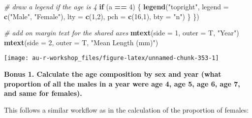 \documentclass[]{book}
\newenvironment{Shaded}{\begin{snugshade}}{\end{snugshade}}
\newcommand{\KeywordTok}[1]{\textcolor[rgb]{0.13,0.29,0.53}{\textbf{#1}}}
\newcommand{\DataTypeTok}[1]{\textcolor[rgb]{0.13,0.29,0.53}{#1}}
\newcommand{\DecValTok}[1]{\textcolor[rgb]{0.00,0.00,0.81}{#1}}
\newcommand{\StringTok}[1]{\textcolor[rgb]{0.31,0.60,0.02}{#1}}
\newcommand{\CommentTok}[1]{\textcolor[rgb]{0.56,0.35,0.01}{\textit{#1}}}
\newcommand{\ControlFlowTok}[1]{\textcolor[rgb]{0.13,0.29,0.53}{\textbf{#1}}}
\newcommand{\OperatorTok}[1]{\textcolor[rgb]{0.81,0.36,0.00}{\textbf{#1}}}
\newcommand{\NormalTok}[1]{#1}
\theoremstyle{definition}
\theoremstyle{definition}
\theoremstyle{definition}
\theoremstyle{remark}
\begin{document}
\begin{Shaded}
\begin{Highlighting}[]
  \CommentTok{# draw a legend if the age is 4}
  \ControlFlowTok{if}\NormalTok{ (a }\OperatorTok{==}\StringTok{ }\DecValTok{4}\NormalTok{) \{}
    \KeywordTok{legend}\NormalTok{(}\StringTok{"topright"}\NormalTok{, }\DataTypeTok{legend =} \KeywordTok{c}\NormalTok{(}\StringTok{"Male"}\NormalTok{, }\StringTok{"Female"}\NormalTok{),}
           \DataTypeTok{lty =} \KeywordTok{c}\NormalTok{(}\DecValTok{1}\NormalTok{,}\DecValTok{2}\NormalTok{), }\DataTypeTok{pch =} \KeywordTok{c}\NormalTok{(}\DecValTok{16}\NormalTok{,}\DecValTok{1}\NormalTok{), }\DataTypeTok{bty =} \StringTok{"n"}\NormalTok{)}
\NormalTok{  \}}
\NormalTok{\})}

\CommentTok{# add on margin text for the shared axes}
\KeywordTok{mtext}\NormalTok{(}\DataTypeTok{side =} \DecValTok{1}\NormalTok{, }\DataTypeTok{outer =}\NormalTok{ T, }\StringTok{"Year"}\NormalTok{)}
\KeywordTok{mtext}\NormalTok{(}\DataTypeTok{side =} \DecValTok{2}\NormalTok{, }\DataTypeTok{outer =}\NormalTok{ T, }\StringTok{"Mean Length (mm)"}\NormalTok{)}
\end{Highlighting}
\end{Shaded}

\begin{center}\texttt{[image: au-r-workshop\_files/figure-latex/unnamed-chunk-353-1]} \end{center}

\textbf{Bonus 1. Calculate the age composition by sex and year (what
proportion of all the males in a year were age 4, age 5, age 6, age 7,
and same for females).}

This follows a similar workflow as in the calculation of the proportion
of females:

\begin{Shaded}
\end{Shaded}
\end{document}
